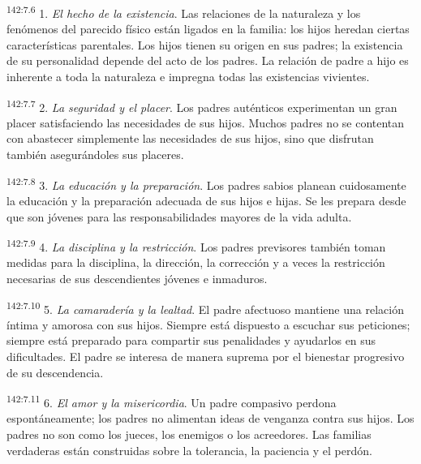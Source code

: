 \par
\textsuperscript{142:7.6} 1. \textit{El hecho de la existencia}. Las relaciones de la naturaleza y los fenómenos del parecido físico están ligados en la familia: los hijos heredan ciertas características parentales. Los hijos tienen su origen en sus padres; la existencia de su personalidad depende del acto de los padres. La relación de padre a hijo es inherente a toda la naturaleza e impregna todas las existencias vivientes.

\par
\textsuperscript{142:7.7} 2. \textit{La seguridad y el placer}. Los padres auténticos experimentan un gran placer satisfaciendo las necesidades de sus hijos. Muchos padres no se contentan con abastecer simplemente las necesidades de sus hijos, sino que disfrutan también asegurándoles sus placeres.

\par
\textsuperscript{142:7.8} 3. \textit{La educación y la preparación}. Los padres sabios planean cuidosamente la educación y la preparación adecuada de sus hijos e hijas. Se les prepara desde que son jóvenes para las responsabilidades mayores de la vida adulta.

\par
\textsuperscript{142:7.9} 4. \textit{La disciplina y la restricción}. Los padres previsores también toman medidas para la disciplina, la dirección, la corrección y a veces la restricción necesarias de sus descendientes jóvenes e inmaduros.

\par
\textsuperscript{142:7.10} 5. \textit{La camaradería y la lealtad}. El padre afectuoso mantiene una relación íntima y amorosa con sus hijos. Siempre está dispuesto a escuchar sus peticiones; siempre está preparado para compartir sus penalidades y ayudarlos en sus dificultades. El padre se interesa de manera suprema por el bienestar progresivo de su descendencia.

\par
\textsuperscript{142:7.11} 6. \textit{El amor y la misericordia}. Un padre compasivo perdona espontáneamente; los padres no alimentan ideas de venganza contra sus hijos. Los padres no son como los jueces, los enemigos o los acreedores. Las familias verdaderas están construidas sobre la tolerancia, la paciencia y el perdón.

